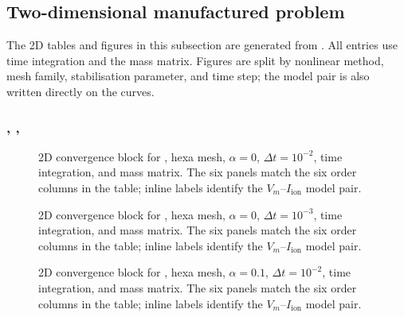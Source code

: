 \subsection{Two-dimensional manufactured problem}
The 2D tables and figures in this subsection are generated from
.
All entries use  time integration and the  mass matrix. Figures are split by nonlinear method, mesh family, stabilisation parameter, and time step; the model pair is also written directly on the curves.

\subsubsection{, , }



\begin{figure}[p]
\centering
{}
\caption{2D convergence block for , hexa mesh, $\alpha=0$, $\Delta t=10^{-2}$,  time integration, and  mass matrix. The six panels match the six order columns in the table; inline labels identify the $V_m$--$I_{\mathrm{ion}}$ model pair.}
\label{fig:results-2d-picard-hexa-alpha-0p0e00-1p0em02}
\end{figure}
\FloatBarrier

\begin{figure}[p]
\centering
{}
\caption{2D convergence block for , hexa mesh, $\alpha=0$, $\Delta t=10^{-3}$,  time integration, and  mass matrix. The six panels match the six order columns in the table; inline labels identify the $V_m$--$I_{\mathrm{ion}}$ model pair.}
\label{fig:results-2d-picard-hexa-alpha-0p0e00-1p0em03}
\end{figure}
\FloatBarrier

\begin{figure}[p]
\centering
{}
\caption{2D convergence block for , hexa mesh, $\alpha=0.1$, $\Delta t=10^{-2}$,  time integration, and  mass matrix. The six panels match the six order columns in the table; inline labels identify the $V_m$--$I_{\mathrm{ion}}$ model pair.}
\label{fig:results-2d-picard-hexa-alpha-1p0em01-1p0em02}
\end{figure}
\FloatBarrier


